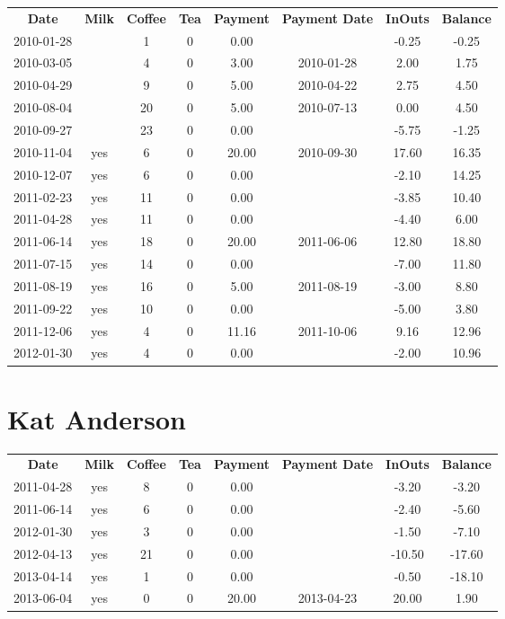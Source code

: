 \begin{center}
\begin{tabular}{cccccccc}
\textbf{Date} & \textbf{Milk} & \textbf{Coffee} & \textbf{Tea} & \textbf{Payment} & \textbf{Payment Date} & \textbf{InOuts} & \textbf{Balance} \\
2010-01-28 &  &  1 & 0 &  0.00 &  & -0.25 & -0.25\\ 
2010-03-05 &  &  4 & 0 &  3.00 & 2010-01-28 &  2.00 &  1.75\\ 
2010-04-29 &  &  9 & 0 &  5.00 & 2010-04-22 &  2.75 &  4.50\\ 
2010-08-04 &  & 20 & 0 &  5.00 & 2010-07-13 &  0.00 &  4.50\\ 
2010-09-27 &  & 23 & 0 &  0.00 &  & -5.75 & -1.25\\ 
2010-11-04 & yes &  6 & 0 & 20.00 & 2010-09-30 & 17.60 & 16.35\\ 
2010-12-07 & yes &  6 & 0 &  0.00 &  & -2.10 & 14.25\\ 
2011-02-23 & yes & 11 & 0 &  0.00 &  & -3.85 & 10.40\\ 
2011-04-28 & yes & 11 & 0 &  0.00 &  & -4.40 &  6.00\\ 
2011-06-14 & yes & 18 & 0 & 20.00 & 2011-06-06 & 12.80 & 18.80\\ 
2011-07-15 & yes & 14 & 0 &  0.00 &  & -7.00 & 11.80\\ 
2011-08-19 & yes & 16 & 0 &  5.00 & 2011-08-19 & -3.00 &  8.80\\ 
2011-09-22 & yes & 10 & 0 &  0.00 &  & -5.00 &  3.80\\ 
2011-12-06 & yes &  4 & 0 & 11.16 & 2011-10-06 &  9.16 & 12.96\\ 
2012-01-30 & yes &  4 & 0 &  0.00 &  & -2.00 & 10.96
\end{tabular}
\end{center}

\section{Kat Anderson}

\begin{center}
\begin{tabular}{cccccccc}
\textbf{Date} & \textbf{Milk} & \textbf{Coffee} & \textbf{Tea} & \textbf{Payment} & \textbf{Payment Date} & \textbf{InOuts} & \textbf{Balance} \\
2011-04-28 & yes &  8 & 0 &  0.00 &  &  -3.20 &  -3.20\\ 
2011-06-14 & yes &  6 & 0 &  0.00 &  &  -2.40 &  -5.60\\ 
2012-01-30 & yes &  3 & 0 &  0.00 &  &  -1.50 &  -7.10\\ 
2012-04-13 & yes & 21 & 0 &  0.00 &  & -10.50 & -17.60\\ 
2013-04-14 & yes &  1 & 0 &  0.00 &  &  -0.50 & -18.10\\ 
2013-06-04 & yes &  0 & 0 & 20.00 & 2013-04-23 &  20.00 &   1.90
\end{tabular}
\end{center}

